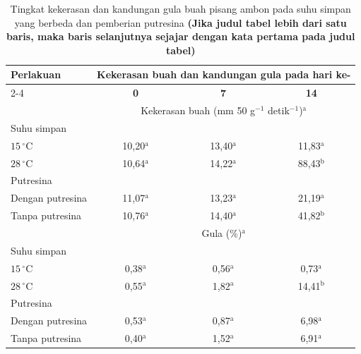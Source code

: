 \clearpage

\begin{table}[H]
  \captionsetup{format=ipbhangonehalf,justification=justified,
    singlelinecheck=false}
  \caption[Tingkat kekerasan dan kandungan gula buah pisang ambon pada suhu
    simpan yang berbeda dan pemberian putresina]{Tingkat kekerasan dan
    kandungan gula buah pisang ambon pada suhu
    simpan yang berbeda dan pemberian putresina
    \textbf{(Jika judul tabel lebih dari satu baris, maka baris selanjutnya
    sejajar dengan kata pertama pada judul tabel)}}
  \label{tab:pisang-ambon}
  {\fontsize{11pt}{12pt}\selectfont
  \begin{tabularx}{13.63cm}{@{}Xccc@{}}
    \toprule
    \multirow{2}{*}{\textbf{Perlakuan}}
      & \multicolumn{3}{c}{\textbf{Kekerasan buah dan kandungan gula pada hari ke-}} \\
    \cmidrule(l){2-4}
      & \textbf{0} & \textbf{7} & \textbf{14} \\
    \midrule
    & \multicolumn{3}{c}{Kekerasan buah (mm 50 g$^{-1}$ detik$^{-1}$)$^{\mathrm{a}}$} \\
    Suhu simpan & & & \\
    \quad $15\,^{\circ}\mathrm{C}$ & 10,20$^{\mathrm{a}}$ & 13,40$^{\mathrm{a}}$ & 11,83$^{\mathrm{a}}$ \\
    \quad $28\,^{\circ}\mathrm{C}$ & 10,64$^{\mathrm{a}}$ & 14,22$^{\mathrm{a}}$ & 88,43$^{\mathrm{b}}$ \\
    Putresina & & & \\
    \quad Dengan putresina & 11,07$^{\mathrm{a}}$ & 13,23$^{\mathrm{a}}$ & 21,19$^{\mathrm{a}}$ \\
    \quad Tanpa putresina & 10,76$^{\mathrm{a}}$ & 14,40$^{\mathrm{a}}$ & 41,82$^{\mathrm{b}}$ \\
    \midrule
    & \multicolumn{3}{c}{Gula (\%)$^{\mathrm{a}}$} \\
    Suhu simpan & & & \\
    \quad $15\,^{\circ}\mathrm{C}$ & 0,38$^{\mathrm{a}}$ & 0,56$^{\mathrm{a}}$ & 0,73$^{\mathrm{a}}$ \\
    \quad $28\,^{\circ}\mathrm{C}$ & 0,55$^{\mathrm{a}}$ & 1,82$^{\mathrm{a}}$ & 14,41$^{\mathrm{b}}$ \\
    Putresina & & & \\
    \quad Dengan putresina & 0,53$^{\mathrm{a}}$ & 0,87$^{\mathrm{a}}$ & 6,98$^{\mathrm{a}}$ \\
    \quad Tanpa putresina & 0,40$^{\mathrm{a}}$ & 1,52$^{\mathrm{a}}$ & 6,91$^{\mathrm{a}}$ \\
    \bottomrule
  \end{tabularx}
  }
\end{table}

